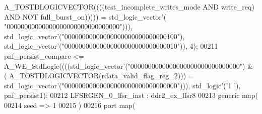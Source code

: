 \begin{DoxyCode}
{      A\_TOSTDLOGICVECTOR}\textcolor{vhdlchar}{(}\textcolor{vhdlchar}{(}\textcolor{vhdlchar}{(}\textcolor{vhdlchar}{(}\textcolor{vhdlchar}{test_incomplete_writes_mode} \textcolor{keywordflow}{AND} \textcolor{vhdlchar}{write_req}\textcolor{vhdlchar}{)} \textcolor{keywordflow}{AND} \textcolor{keywordflow}{NOT} \textcolor{vhdlchar}{full_burst_on}\textcolor{vhdlchar}{)}\textcolor{vhdlchar}{)}\textcolor{vhdlchar}{)}\textcolor{vhdlchar}{)}\textcolor{vhdlchar}{)} \textcolor{vhdlchar}{=} \textcolor{comment}{std\_logic\_vector}\textcolor{vhdlchar}{'}\textcolor{vhdlchar}{(}\textcolor{vhdllogic}{
      "00000000000000000000000000000000"}\textcolor{vhdlchar}{)}\textcolor{vhdlchar}{)}\textcolor{vhdlchar}{)}\textcolor{vhdlchar}{,} \textcolor{comment}{std\_logic\_vector}\textcolor{vhdlchar}{'}\textcolor{vhdlchar}{(}\textcolor{vhdllogic}{"00000000000000000000000000000100"}\textcolor{vhdlchar}{)}\textcolor{vhdlchar}{,} \textcolor{comment}{
      std\_logic\_vector}\textcolor{vhdlchar}{'}\textcolor{vhdlchar}{(}\textcolor{vhdllogic}{"00000000000000000000000000000010"}\textcolor{vhdlchar}{)}\textcolor{vhdlchar}{)}\textcolor{vhdlchar}{,} \textcolor{vhdllogic}{}\textcolor{vhdllogic}{4}\textcolor{vhdlchar}{)};
00211   \textcolor{vhdlchar}{pnf_persist_compare} \textcolor{vhdlchar}{<=} \textcolor{vhdlchar}{A\_WE\_StdLogic}\textcolor{vhdlchar}{(}\textcolor{vhdlchar}{(}\textcolor{vhdlchar}{(}\textcolor{vhdlchar}{(}\textcolor{comment}{std\_logic\_vector}\textcolor{vhdlchar}{'}\textcolor{vhdlchar}{(}\textcolor{vhdllogic}{"0000000000000000000000000000000"}\textcolor{vhdlchar}{)} \textcolor{vhdlchar}{&} \textcolor{vhdlchar}{(}\textcolor{vhdlchar}{
      A\_TOSTDLOGICVECTOR}\textcolor{vhdlchar}{(}\textcolor{vhdlchar}{rdata_valid_flag_reg_2}\textcolor{vhdlchar}{)}\textcolor{vhdlchar}{)}\textcolor{vhdlchar}{)} \textcolor{vhdlchar}{=} \textcolor{comment}{std\_logic\_vector}\textcolor{vhdlchar}{'}\textcolor{vhdlchar}{(}\textcolor{vhdllogic}{"00000000000000000000000000000000"}\textcolor{vhdlchar}{)}\textcolor{vhdlchar}{)}\textcolor{vhdlchar}{)}\textcolor{vhdlchar}{,} \textcolor{comment}{std\_logic}\textcolor{vhdlchar}{'}\textcolor{vhdlchar}{(}\textcolor{vhdlchar}{'}\textcolor{vhdllogic}{}\textcolor{vhdllogic}{1}\textcolor{vhdlchar}{
      '}\textcolor{vhdlchar}{)}\textcolor{vhdlchar}{,} \textcolor{vhdlchar}{pnf_persist1}\textcolor{vhdlchar}{)};
00212   LFSRGEN\_0\_lfsr\_inst : ddr2_ex_lfsr8
00213     \textcolor{keywordflow}{generic} \textcolor{keywordflow}{map}(
00214       seed => \textcolor{vhdllogic}{1}
00215     \textcolor{vhdlchar}{)}
00216     \textcolor{keywordflow}{port} \textcolor{keywordflow}{map}(

\end{DoxyCode}
